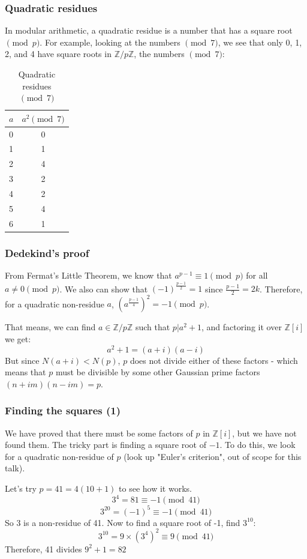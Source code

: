 \documentclass{beamer}
\begin{document}
\begin{frame}
	\frametitle{Quadratic residues}

	In modular arithmetic, a quadratic residue is a number that has a square root
	$\pmod{p}$. For example, looking at the numbers $\pmod{7}$, we see that only 0, 1, 2, 
	and 4 have square roots in $\mathbb{Z}/p\mathbb{Z}$, the numbers $\pmod{7}$:
       \begin{table}
\begin{tabular}{| l | c |}
        \hline
	$a$ & $a^2 \pmod{7}$\\
	\hline
	0 & 0 \\
	1 & 1 \\
	2 & 4 \\
	3 & 2 \\
	4 & 2 \\
	5 & 4 \\
	6 & 1 \\
	\hline
\end{tabular}
	       \caption*{Quadratic residues $\pmod{7}$}
\end{table}

\end{frame}

\begin{frame}
	\frametitle{Dedekind's proof}

	From Fermat's Little Theorem, we know that $a^{p-1} \equiv 1 \pmod{p}$ for all
	$a\neq 0 \pmod{p}$. We also can show that $(-1)^{\frac{p-1}{2}} = 1$ since 
	$\frac{p-1}{2} = 2k$. Therefore, for a quadratic non-residue $a$,
	$(a^{\frac{p-1}{4}})^2 = -1 \pmod{p}$.

	That means, we can find $a \in \mathbb{Z}/p\mathbb{Z}$ such that $p | a^2 + 1$, and
	factoring it over $\mathbb{Z}[i]$ we get:
	\[a^2 + 1 = (a+i)(a-i) \]
	But since $N(a+i)<N(p)$, $p$ does not divide either of these factors - which means
	that $p$ must be divisible by some other Gaussian prime factors $(n+im)(n-im) = p$.
\end{frame}

\begin{frame}
	\frametitle{Finding the squares (1)}

	We have proved that there must be some factors of $p$ in $\mathbb{Z}[i]$, but we
	have not found them. The tricky part is finding a square root of $-1$. To do this,
	we look for a quadratic non-residue of $p$ (look up "Euler's criterion", out of
	scope for this talk).

	Let's try $p=41 = 4(10+1)$ to see how it works.
	\[ 3^4 = 81 \equiv -1 \pmod{41} \]
	\[ 3^{20} = (-1)^5 \equiv -1 \pmod{41} \]
	So 3 is a non-residue of 41. Now to find a square root of -1, find $3^{10}$:
	\[ 3^{10} = 9\times(3^4)^2 \equiv 9 \pmod{41} \]
	Therefore, 41 divides $9^2 + 1 = 82$
\end{frame}
\end{document}
